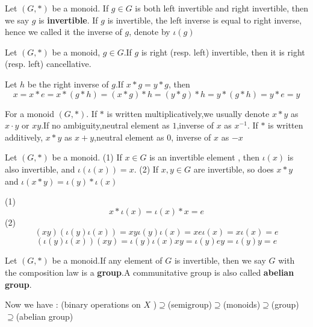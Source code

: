 \documentclass{book}
\numberwithin{equation}{section}
\begin{document}
\begin{definitionenv}
    Let $(G,*)$ be a monoid. If $g\in G$ is both left invertible and right invertible, then we say $g$ is \textbf{invertible}.
    If $g$ is invertible, the left inverse is equal to right inverse, hence we called it the inverse of $g$, denote by $\iota(g)$
\end{definitionenv}
\begin{propositionenv}
    Let $(G,*)$ be a monoid, $g\in G$.If $g$ is right (resp. left) invertible, then it is right (resp. left) cancellative.
\end{propositionenv}
\begin{proofenv}
    Let $h$ be the right inverse of $g$.If $x*g=y*g$, then 
    $$x=x*e=x*(g*h)=(x*g)*h=(y*g)*h=y*(g*h)=y*e=y$$
\end{proofenv}
\begin{notationenv}
    For a monoid $(G,*)$.
    \newline
    If $*$ is written multiplicatively,we usually denote $x*y$ as $x\cdot y$ or $xy$.If no ambiguity,neutral element as $1$,inverse of $x$ as $x^{-1}$.
    \newline
    If $*$ is written additively, $x*y$ as $x+y$,neutral element as $0$, inverse of $x$ as $-x$
\end{notationenv}
\begin{propositionenv}\label{proposition5.2.4}
    Let $(G,*)$ be a monoid.
    \newline
    (1) If $x\in G$ is an invertible element , then $\iota (x)$ is also invertible, and $\iota(\iota(x))=x$.
    \newline
    (2) If $x,y\in G$ are invertible, so does $x*y$ and $\iota(x*y)=\iota(y)*\iota(x)$
\end{propositionenv}
\begin{proofenv}
    \quad\newline
    (1) $$x*\iota(x)=\iota(x)*x=e$$
    (2) $$(xy)(\iota(y)\iota(x))=xy\iota(y)\iota(x)=xe\iota(x)=x\iota(x)=e$$
    $$(\iota(y)\iota(x))(xy)=\iota(y)\iota(x)xy=\iota(y)ey=\iota(y)y=e$$
\end{proofenv}
\begin{definitionenv}
    Let $(G,*)$ be a monoid.If any element of $G$ is invertible, then we say $G$ with the composition law is a \textbf{group}.A communitative group is also called \textbf{abelian group}.
\end{definitionenv}
\begin{box2}
   Now we have : 
   \newline
   {\color{mlv} (binary operations on $X$ )$\supseteq$(semigroup)$\supseteq$(monoids)$\supseteq$(group)$\supseteq$(abelian group)}

\end{box2}
\end{document}

